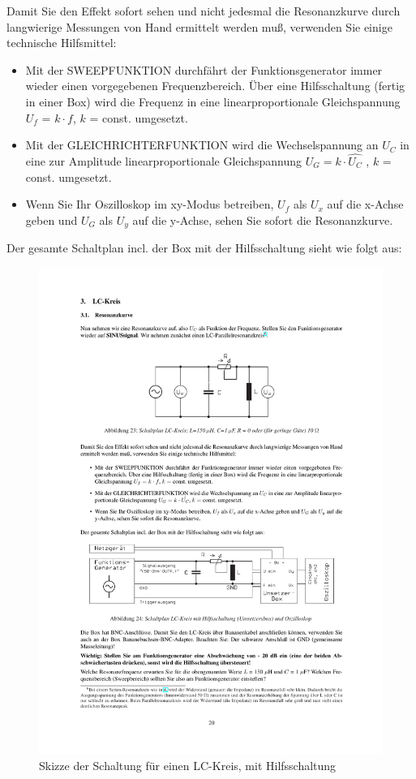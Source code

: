 \documentclass[12pt]{scrartcl}
\begin{document}
Damit Sie den Effekt sofort sehen und nicht jedesmal die Resonanzkurve durch langwierige Messungen von Hand
ermittelt werden muß, verwenden Sie einige technische Hilfsmittel:
\begin{itemize}
\item
Mit der SWEEPFUNKTION durchfährt der Funktionsgenerator immer wieder einen vorgegebenen Frequenzbereich. Über eine Hilfsschaltung (fertig in einer Box) wird die Frequenz in eine linearproportionale
Gleichspannung $U_f$ = $k \cdot f$, $k$ = const. umgesetzt.
\item
Mit der GLEICHRICHTERFUNKTION wird die Wechselspannung an $U_C$ in eine zur Amplitude linearproportionale Gleichspannung $U_G = k \cdot \hat{U_C}$ , $k$ = const. umgesetzt.
\item
Wenn Sie Ihr Oszilloskop im xy-Modus betreiben, $U_f$ als $U_x$
auf die x-Achse geben und $U_G$ als $U_y$ auf die y-Achse, sehen Sie sofort die Resonanzkurve.
\end{itemize}
Der gesamte Schaltplan incl. der Box mit der Hilfsschaltung sieht wie folgt aus:
\begin{figure}[htbp] 
  \centering
    \includegraphics[trim = 20mm 90mm 1mm 165mm, clip, scale = 1]{LC_kreis.pdf}
  	\caption[Skizze der Schaltung für einen LC-Kreis, mit Hilfsschaltung]{Skizze der Schaltung für einen LC-Kreis, mit Hilfsschaltung\footnotemark}
  \label{fig:LC-Kreis_hilfe}
\end{figure}
\end{document}
